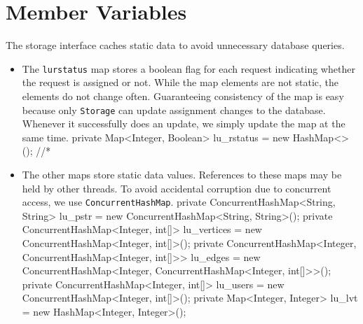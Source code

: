 \section{Member Variables}
The storage interface caches static data to avoid unnecessary database queries.
\begin{itemize}
\item The {\tt{}lu{}rstatus} map stores a boolean flag for each request indicating
whether the request is assigned or not. While the map elements are not static,
the elements do not change often. Guaranteeing consistency of the map is easy
because only {\tt{}Storage} can update assignment changes to the database.
Whenever it successfully does an update, we simply update the map at the same
time.
\nwenddocs{}\endmoddef{}
private Map<Integer, Boolean> lu_rstatus = new HashMap<>();  //*
\nwendcode{}\nwdocspar
\item The other maps store static data values. References to these maps may be
held by other threads. To avoid accidental corruption due to concurrent access,
we use {\tt{}ConcurrentHashMap}.
\nwenddocs{}\plusendmoddef
private ConcurrentHashMap<String, String> lu_pstr     = new ConcurrentHashMap<String, String>();
private ConcurrentHashMap<Integer, int[]> lu_vertices = new ConcurrentHashMap<Integer, int[]>();
private ConcurrentHashMap<Integer,
    ConcurrentHashMap<Integer, int[]>>    lu_edges    = new ConcurrentHashMap<Integer, ConcurrentHashMap<Integer, int[]>>();
private ConcurrentHashMap<Integer, int[]> lu_users    = new ConcurrentHashMap<Integer, int[]>();
private Map<Integer, Integer>             lu_lvt      = new HashMap<Integer, Integer>();
\nwendcode{}\nwdocspar
\end{itemize}

